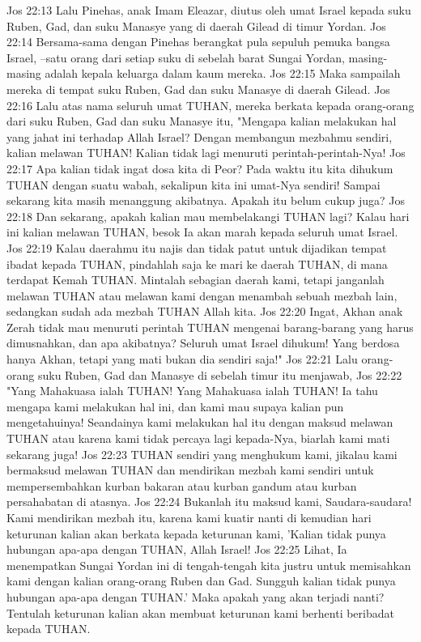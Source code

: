 Jos 22:13  Lalu Pinehas, anak Imam Eleazar, diutus oleh umat Israel kepada suku Ruben, Gad, dan suku Manasye yang di daerah Gilead di timur Yordan.
Jos 22:14  Bersama-sama dengan Pinehas berangkat pula sepuluh pemuka bangsa Israel, --satu orang dari setiap suku di sebelah barat Sungai Yordan, masing-masing adalah kepala keluarga dalam kaum mereka.
Jos 22:15  Maka sampailah mereka di tempat suku Ruben, Gad dan suku Manasye di daerah Gilead.
Jos 22:16  Lalu atas nama seluruh umat TUHAN, mereka berkata kepada orang-orang dari suku Ruben, Gad dan suku Manasye itu, "Mengapa kalian melakukan hal yang jahat ini terhadap Allah Israel? Dengan membangun mezbahmu sendiri, kalian melawan TUHAN! Kalian tidak lagi menuruti perintah-perintah-Nya!
Jos 22:17  Apa kalian tidak ingat dosa kita di Peor? Pada waktu itu kita dihukum TUHAN dengan suatu wabah, sekalipun kita ini umat-Nya sendiri! Sampai sekarang kita masih menanggung akibatnya. Apakah itu belum cukup juga?
Jos 22:18  Dan sekarang, apakah kalian mau membelakangi TUHAN lagi? Kalau hari ini kalian melawan TUHAN, besok Ia akan marah kepada seluruh umat Israel.
Jos 22:19  Kalau daerahmu itu najis dan tidak patut untuk dijadikan tempat ibadat kepada TUHAN, pindahlah saja ke mari ke daerah TUHAN, di mana terdapat Kemah TUHAN. Mintalah sebagian daerah kami, tetapi janganlah melawan TUHAN atau melawan kami dengan menambah sebuah mezbah lain, sedangkan sudah ada mezbah TUHAN Allah kita.
Jos 22:20  Ingat, Akhan anak Zerah tidak mau menuruti perintah TUHAN mengenai barang-barang yang harus dimusnahkan, dan apa akibatnya? Seluruh umat Israel dihukum! Yang berdosa hanya Akhan, tetapi yang mati bukan dia sendiri saja!"
Jos 22:21  Lalu orang-orang suku Ruben, Gad dan Manasye di sebelah timur itu menjawab,
Jos 22:22  "Yang Mahakuasa ialah TUHAN! Yang Mahakuasa ialah TUHAN! Ia tahu mengapa kami melakukan hal ini, dan kami mau supaya kalian pun mengetahuinya! Seandainya kami melakukan hal itu dengan maksud melawan TUHAN atau karena kami tidak percaya lagi kepada-Nya, biarlah kami mati sekarang juga!
Jos 22:23  TUHAN sendiri yang menghukum kami, jikalau kami bermaksud melawan TUHAN dan mendirikan mezbah kami sendiri untuk mempersembahkan kurban bakaran atau kurban gandum atau kurban persahabatan di atasnya.
Jos 22:24  Bukanlah itu maksud kami, Saudara-saudara! Kami mendirikan mezbah itu, karena kami kuatir nanti di kemudian hari keturunan kalian akan berkata kepada keturunan kami, 'Kalian tidak punya hubungan apa-apa dengan TUHAN, Allah Israel!
Jos 22:25  Lihat, Ia menempatkan Sungai Yordan ini di tengah-tengah kita justru untuk memisahkan kami dengan kalian orang-orang Ruben dan Gad. Sungguh kalian tidak punya hubungan apa-apa dengan TUHAN.' Maka apakah yang akan terjadi nanti? Tentulah keturunan kalian akan membuat keturunan kami berhenti beribadat kepada TUHAN.
